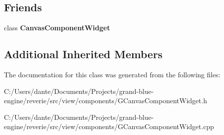 \subsection*{Friends}
\begin{DoxyCompactItemize}
\item 
\mbox{\label{classrev_1_1_view_1_1_billboard_flags_widget_a4172d6b2f3348837e829df46172fbff8}} 
class {\bfseries Canvas\+Component\+Widget}
\end{DoxyCompactItemize}
\subsection*{Additional Inherited Members}


The documentation for this class was generated from the following files\+:\begin{DoxyCompactItemize}
\item 
C\+:/\+Users/dante/\+Documents/\+Projects/grand-\/blue-\/engine/reverie/src/view/components/G\+Canvas\+Component\+Widget.\+h\item 
C\+:/\+Users/dante/\+Documents/\+Projects/grand-\/blue-\/engine/reverie/src/view/components/G\+Canvas\+Component\+Widget.\+cpp\end{DoxyCompactItemize}
